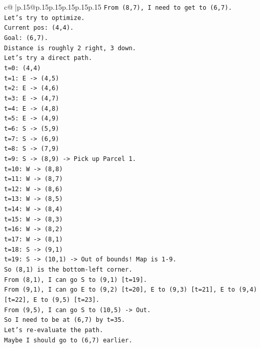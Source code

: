 \documentclass{article}
\begin{document}
{\begin{supertabular}{c@{$\;$}|p{.15\linewidth}@{}p{.15\linewidth}p{.15\linewidth}p{.15\linewidth}p{.15\linewidth}p{.15\linewidth}}
{{{\texttt{From (8,7), I need to get to (6,7).} \\
\texttt{Let's try to optimize.} \\
\texttt{Current pos: (4,4).} \\
\texttt{Goal: (6,7).} \\
\texttt{Distance is roughly 2 right, 3 down.} \\
\texttt{Let's try a direct path.} \\
\texttt{t=0: (4,4)} \\
\texttt{t=1: E {-}> (4,5)} \\
\texttt{t=2: E {-}> (4,6)} \\
\texttt{t=3: E {-}> (4,7)} \\
\texttt{t=4: E {-}> (4,8)} \\
\texttt{t=5: E {-}> (4,9)} \\
\texttt{t=6: S {-}> (5,9)} \\
\texttt{t=7: S {-}> (6,9)} \\
\texttt{t=8: S {-}> (7,9)} \\
\texttt{t=9: S {-}> (8,9) {-}> Pick up Parcel 1.} \\
\texttt{t=10: W {-}> (8,8)} \\
\texttt{t=11: W {-}> (8,7)} \\
\texttt{t=12: W {-}> (8,6)} \\
\texttt{t=13: W {-}> (8,5)} \\
\texttt{t=14: W {-}> (8,4)} \\
\texttt{t=15: W {-}> (8,3)} \\
\texttt{t=16: W {-}> (8,2)} \\
\texttt{t=17: W {-}> (8,1)} \\
\texttt{t=18: S {-}> (9,1)} \\
\texttt{t=19: S {-}> (10,1) {-}> Out of bounds! Map is 1{-}9.} \\
\texttt{So (8,1) is the bottom{-}left corner.} \\
\texttt{From (8,1), I can go S to (9,1) {[}t=19{]}.} \\
\texttt{From (9,1), I can go E to (9,2) {[}t=20{]}, E to (9,3) {[}t=21{]}, E to (9,4) {[}t=22{]}, E to (9,5) {[}t=23{]}.} \\
\texttt{From (9,5), I can go S to (10,5) {-}> Out.} \\
\texttt{So I need to be at (6,7) by t=35.} \\
\texttt{Let's re{-}evaluate the path.} \\
\texttt{Maybe I should go to (6,7) earlier.} \\
}}}
\end{supertabular}}
\end{document}
